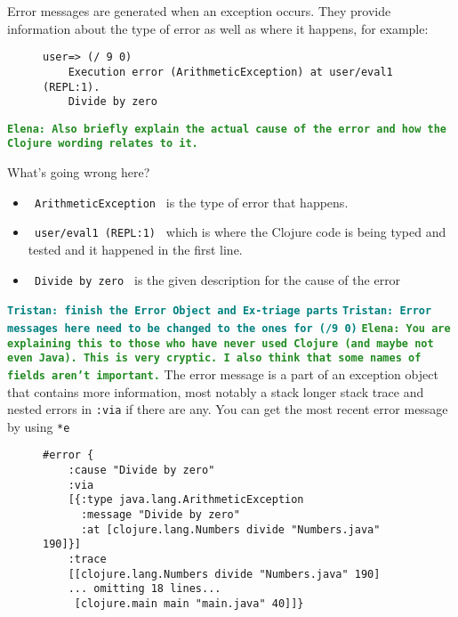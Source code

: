 \documentclass[12pt]{article}
\newcommand{\comment}[1]{{\bf \tt  {#1}}}
\newcommand{\emcomment}[1]{\textcolor{ForestGreen}{\comment{Elena: {#1}}}}
\newcommand{\tkcomment}[1]{\textcolor{Teal}{\comment{Tristan: {#1}}}}
\begin{document}
   Error messages are generated when an exception occurs. They provide information about
   the type of error as well as where it happens, for example:

	\begin{figure}[h]
		\centering
		\begin{lstlisting}[breaklines=true, basicstyle=\ttfamily]
	user=> (/ 9 0)
	Execution error (ArithmeticException) at user/eval1 (REPL:1).
	Divide by zero
		\end{lstlisting}
	\end{figure}
\emcomment{Also briefly explain the actual cause of the error and how the Clojure wording relates to it.}	

What’s going wrong here?
	\begin{itemize}
		\item \texttt{ ArithmeticException } is the type of error that happens.
		\item \texttt{ user/eval1 (REPL:1) } which is where the Clojure code is being typed and tested and it happened in the first line.
		\item \texttt{ Divide by zero } is the given description for the cause of the error
	\end{itemize}

	\tkcomment{finish the Error Object and Ex-triage parts}
	\tkcomment{Error messages here need to be changed to the ones for (/9 0)}
\emcomment{You are explaining this to those who have never used Clojure (and maybe not even Java). This is very cryptic. I also think that some names of fields aren't important.}
	The error message is a part of an exception object that contains more information,
	most notably a stack longer stack trace and nested errors in \texttt{:via} if there are any. You can get the most recent error message by using \texttt{*e}
	\begin{figure}[h]
		\centering
		\begin{lstlisting}[breaklines=true, basicstyle=\ttfamily]
#error {
	:cause "Divide by zero"
	:via
	[{:type java.lang.ArithmeticException
	  :message "Divide by zero"
	  :at [clojure.lang.Numbers divide "Numbers.java" 190]}]
	:trace
	[[clojure.lang.Numbers divide "Numbers.java" 190]
	... omitting 18 lines...
	 [clojure.main main "main.java" 40]]}

		\end{lstlisting}
	\end{figure}
	
\end{document}
